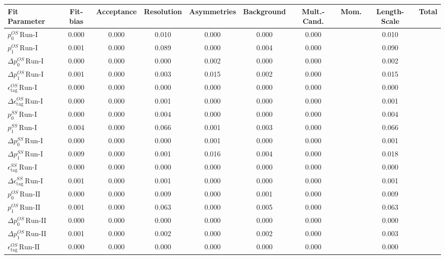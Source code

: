 \begin{tabular}{l  c  c  c  c  c  c  c  | c }
\hline
\hline
Fit Parameter & Fit-bias & Acceptance & Resolution & Asymmetries & Background & Mult.-Cand. & Mom. & Length-Scale &  Total  \\ 
\hline
$p_{0}^{OS} \, \text{Run-I}$ & 0.000 & 0.000 & 0.010 & 0.000 & 0.000 & 0.000 &  & 0.010 \\ 
$p_{1}^{OS} \, \text{Run-I}$ & 0.001 & 0.000 & 0.089 & 0.000 & 0.004 & 0.000 &  & 0.090 \\ 
$\Delta p_{0}^{OS} \, \text{Run-I}$ & 0.000 & 0.000 & 0.000 & 0.002 & 0.000 & 0.000 &  & 0.002 \\ 
$\Delta p_{1}^{OS} \, \text{Run-I}$ & 0.001 & 0.000 & 0.003 & 0.015 & 0.002 & 0.000 &  & 0.015 \\ 
$\epsilon_{\text{tag}}^{OS} \, \text{Run-I}$ & 0.000 & 0.000 & 0.000 & 0.000 & 0.000 & 0.000 &  & 0.000 \\ 
$\Delta \epsilon_{\text{tag}}^{OS} \, \text{Run-I}$ & 0.000 & 0.000 & 0.001 & 0.000 & 0.000 & 0.000 &  & 0.001 \\ 
$p_{0}^{SS} \, \text{Run-I}$ & 0.000 & 0.000 & 0.004 & 0.000 & 0.000 & 0.000 &  & 0.004 \\ 
$p_{1}^{SS} \, \text{Run-I}$ & 0.004 & 0.000 & 0.066 & 0.001 & 0.003 & 0.000 &  & 0.066 \\ 
$\Delta p_{0}^{SS} \, \text{Run-I}$ & 0.000 & 0.000 & 0.000 & 0.001 & 0.000 & 0.000 &  & 0.001 \\ 
$\Delta p_{1}^{SS} \, \text{Run-I}$ & 0.009 & 0.000 & 0.001 & 0.016 & 0.004 & 0.000 &  & 0.018 \\ 
$\epsilon_{\text{tag}}^{SS} \, \text{Run-I}$ & 0.000 & 0.000 & 0.000 & 0.000 & 0.000 & 0.000 &  & 0.000 \\ 
$\Delta \epsilon_{\text{tag}}^{SS} \, \text{Run-I}$ & 0.001 & 0.000 & 0.001 & 0.000 & 0.000 & 0.000 &  & 0.001 \\ 
$p_{0}^{OS} \, \text{Run-II}$ & 0.000 & 0.000 & 0.009 & 0.000 & 0.001 & 0.000 &  & 0.009 \\ 
$p_{1}^{OS} \, \text{Run-II}$ & 0.001 & 0.000 & 0.063 & 0.000 & 0.005 & 0.000 &  & 0.063 \\ 
$\Delta p_{0}^{OS} \, \text{Run-II}$ & 0.000 & 0.000 & 0.000 & 0.000 & 0.000 & 0.000 &  & 0.000 \\ 
$\Delta p_{1}^{OS} \, \text{Run-II}$ & 0.001 & 0.000 & 0.002 & 0.000 & 0.002 & 0.000 &  & 0.003 \\ 
$\epsilon_{\text{tag}}^{OS} \, \text{Run-II}$ & 0.000 & 0.000 & 0.000 & 0.000 & 0.000 & 0.000 &  & 0.000 \\ 

\end{tabular}
